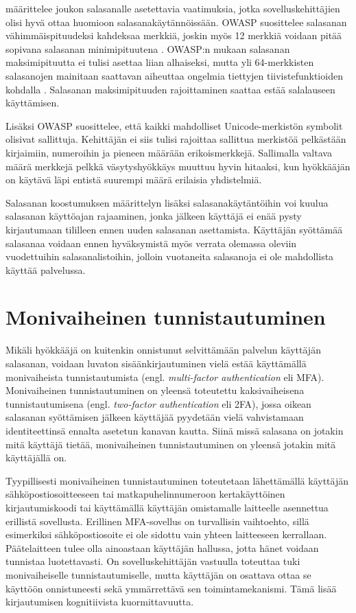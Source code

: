 \citet{owasp_authentication_2023} määrittelee joukon salasanalle asetettavia vaatimuksia, jotka sovelluskehittäjien olisi hyvä ottaa huomioon salasanakäytännöissään. OWASP suosittelee salasanan vähimmäispituudeksi kahdeksaa merkkiä, joskin myös 12 merkkiä voidaan pitää sopivana salasanan minimipituutena \citep{bosnjak_brute-force_2018}. OWASP:n mukaan salasanan maksimipituutta ei tulisi asettaa liian alhaiseksi, mutta yli 64-merkkisten salasanojen mainitaan saattavan aiheuttaa ongelmia tiettyjen tiivistefunktioiden kohdalla \citep{owasp_authentication_2023}. Salasanan maksimipituuden rajoittaminen saattaa estää salalauseen käyttämisen.

Lisäksi OWASP suosittelee, että kaikki mahdolliset Unicode-merkistön symbolit olisivat sallittuja. Kehittäjän ei siis tulisi rajoittaa sallittua merkistöä pelkästään kirjaimiin, numeroihin ja pieneen määrään erikoismerkkejä. Sallimalla valtava määrä merkkejä pelkkä väsytyshyökkäys muuttuu hyvin hitaaksi, kun hyökkääjän on käytävä läpi entistä suurempi määrä erilaisia yhdistelmiä.

Salasanan koostumuksen määrittelyn lisäksi salasanakäytäntöihin voi kuulua salasanan käyttöajan rajaaminen, jonka jälkeen käyttäjä ei enää pysty kirjautumaan tililleen ennen uuden salasanan asettamista. Käyttäjän syöttämää salasanaa voidaan ennen hyväksymistä myös verrata olemassa oleviin vuodettuihin salasanalistoihin, jolloin vuotaneita salasanoja ei ole mahdollista käyttää palvelussa.

\section{Monivaiheinen tunnistautuminen\label{sec:monivaiheinen_tunnistautuminen}}

Mikäli hyökkääjä on kuitenkin onnistunut selvittämään palvelun käyttäjän salasanan, voidaan luvaton sisäänkirjautuminen vielä estää käyttämällä monivaiheista tunnistautumista (engl. \textit{multi-factor authentication} eli MFA). Monivaiheinen tunnistautuminen on yleensä toteutettu kaksivaiheisena tunnistautumisena (engl. \textit{two-factor authentication} eli 2FA), jossa oikean salasanan syöttämisen jälkeen käyttäjää pyydetään vielä vahvistamaan identiteettinsä ennalta asetetun kanavan kautta. Siinä missä salasana on jotakin mitä käyttäjä tietää, monivaiheinen tunnistautuminen on yleensä jotakin mitä käyttäjällä on.

Tyypillisesti monivaiheinen tunnistautuminen toteutetaan lähettämällä käyttäjän sähköpostiosoitteeseen tai matkapuhelinnumeroon kertakäyttöinen kirjautumiskoodi tai käyttämällä käyttäjän omistamalle laitteelle asennettua erillistä sovellusta. Erillinen MFA-sovellus on turvallisin vaihtoehto, sillä esimerkiksi sähköpostiosoite ei ole sidottu vain yhteen laitteeseen kerrallaan. Päätelaitteen tulee olla ainoastaan käyttäjän hallussa, jotta hänet voidaan tunnistaa luotettavasti. On sovelluskehittäjän vastuulla toteuttaa tuki monivaiheiselle tunnistautumiselle, mutta käyttäjän on osattava ottaa se käyttöön onnistuneesti sekä ymmärrettävä sen toimintamekanismi. Tämä lisää kirjautumisen kognitiivista kuormittavuutta.

